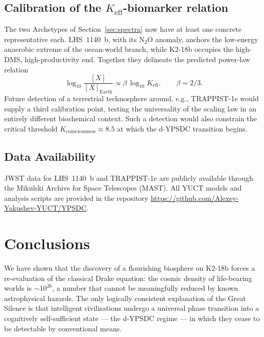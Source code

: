 \documentclass[12pt,a4paper]{article}
\begin{document}
	\subsection{Calibration of the $K_{\mathrm{eff}}$-biomarker relation}
	The two Archetypes of Section~\ref{sec:spectra} now have at least one concrete representative each.  LHS~1140~b, with its N$_2$O anomaly, anchors the low-energy anaerobic extreme of the ocean-world branch, while K2-18b occupies the high-DMS, high-productivity end.  Together they delineate the predicted power-law relation
	\begin{equation}
		\log_{10} \frac{[X]}{[X]_{\mathrm{Earth}}} \propto \beta\,\log_{10} K_{\mathrm{eff}} ,\qquad \beta=2/3 .
	\end{equation}
	Future detection of a terrestrial technosphere around, e.g., TRAPPIST-1e would supply a third calibration point, testing the universality of the scaling law in an entirely different biochemical context.  Such a detection would also constrain the critical threshold $K_{\mathrm{consciousness}}\approx 8.5$ at which the d-YPSDC transition begins.
	
	\subsection*{Data Availability}
	JWST data for LHS~1140~b and TRAPPIST-1e are publicly available through the Mikulski Archive for Space Telescopes (MAST).  All YUCT models and analysis scripts are provided in the repository \url{https://github.com/Alexey-Yakushev-YUCT/YPSDC}.
	
	\section{Conclusions}
	\label{sec:conclusions}
	We have shown that the discovery of a flourishing biosphere on K2-18b
	forces a re-evaluation of the classical Drake equation: the cosmic
	density of life-bearing worlds is $\sim 10^{26}$, a number that cannot
	be meaningfully reduced by known astrophysical hazards.  The only
	logically consistent explanation of the Great Silence is that
	intelligent civilisations undergo a universal phase transition into a
	cognitively self-sufficient state --- the d-YPSDC regime --- in which they
	cease to be detectable by conventional means.
	
\end{document}
